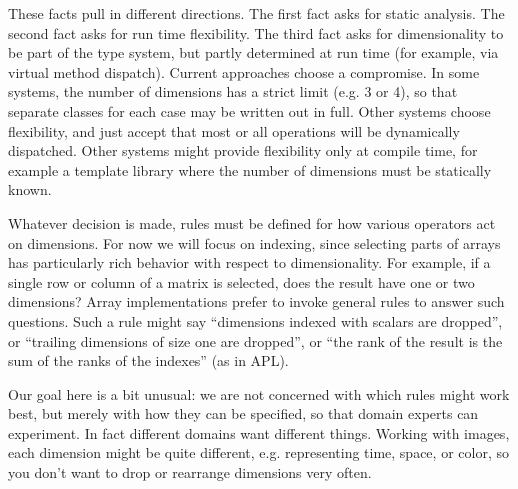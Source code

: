 These facts pull in different directions. The first fact asks for static
analysis. The second fact asks for run time flexibility. The third fact asks
for dimensionality to be part of the type system, but partly determined
at run time (for example, via virtual method dispatch). Current approaches
choose a compromise. In some systems, the number of dimensions has a strict
limit (e.g. 3 or 4), so that separate classes for each case may be written
out in full. Other systems choose flexibility, and just accept that most
or all operations will be dynamically dispatched. Other systems might
provide flexibility only at compile time, for example a template library
where the number of dimensions must be statically known.



Whatever decision is made, rules must be defined for how various operators
act on dimensions. For now we will focus on indexing, since selecting
parts of arrays has particularly rich behavior with respect to
dimensionality. For example, if a single row or column of a matrix is
selected, does the result have one or two dimensions? Array implementations
prefer to invoke general rules to answer such questions. Such a rule might
say ``dimensions indexed with scalars are dropped'', or ``trailing
dimensions of size one are dropped'', or ``the rank of the result
is the sum of the ranks of the indexes'' (as in APL).

Our goal here is a bit unusual: we are not concerned with which rules
might work best, but merely with how they can be specified, so that
domain experts can experiment.
In fact different domains want different things. Working with images, each
dimension might be quite different, e.g. representing time, space, or color,
so you don't want to drop or rearrange dimensions very often.



